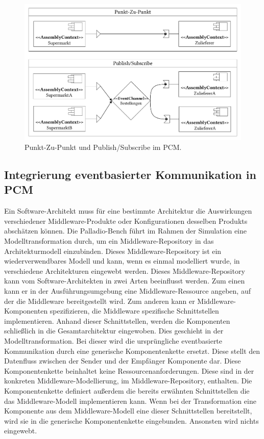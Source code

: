 \begin{figure}
\center
  \includegraphics[width=1\textwidth]{images/grundlagen/grundlagenEventSystem.pdf}
  \caption{Punkt-Zu-Punkt und Publish/Subscribe im PCM.}
  \label{img:grundlageneventssystem}
\end{figure}



\subsection{Integrierung eventbasierter Kommunikation in PCM}
\label{sec:eventbasetransformation}
Ein Software-Architekt muss für eine bestimmte Architektur die Auswirkungen verschiedener Middleware-Produkte oder Konfigurationen desselben Produkts abschätzen können. Die Palladio-Bench führt im Rahmen der Simulation eine Modelltransformation durch, um ein Middleware-Repository in das Architekturmodell einzubinden. Dieses Middle\-ware-Repository ist ein wiederverwendbares Modell und kann, wenn es einmal modelliert wurde, in verschiedene Architekturen eingewebt werden. Dieses Middleware-Repository kann vom Software-Architekten in zwei Arten beeinflusst werden. Zum einen kann er in der Ausführungsumgebung eine Middleware-Ressource angeben, auf der die Middleware bereitgestellt wird. Zum anderen kann er Middleware-Komponen\-ten spezifizieren, die Middleware spezifische Schnittstellen implementieren. Anhand dieser Schnittstellen, werden die Komponenten schließlich in die Gesamtarchitektur eingewoben. Dies geschieht in der Modelltransformation. Bei dieser wird die ursprüngliche eventbasierte Kommunikation durch eine generische Komponentenkette ersetzt. Diese stellt den Datenfluss zwischen der Sender und der Empfänger Komponente dar. Diese Komponentenkette beinhaltet keine Ressourcenanforderungen. Diese sind in der konkreten Middleware-Modellierung, im Middleware-Repository, enthalten. Die Komponentenkette definiert außerdem die bereits erwähnten Schnittstellen die das Middleware-Modell implementieren kann. Wenn bei der Transformation eine Komponente aus dem Middleware-Modell eine dieser Schnittstellen bereitstellt, wird sie in die generische Komponentenkette eingebunden. Ansonsten wird nichts eingewebt.

